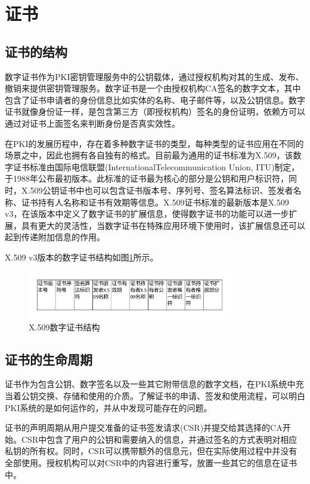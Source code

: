 \section{证书}

\subsection{证书的结构}

数字证书作为PKI密钥管理服务中的公钥载体，通过授权机构对其的生成、发布、撤销来提供密钥管理服务。数字证书是一个由授权机构CA签名的数字文本，其中包含了证书申请者的身份信息比如实体的名称、电子邮件等，以及公钥信息。数字证书就像身份证一样，是包含第三方（即授权机构）签名的身份证明，依赖方可以通过对证书上面签名来判断身份是否真实效性。

在PKI的发展历程中，存在着多种数字证书的类型，每种类型的证书应用在不同的场景之中，因此也拥有各自独有的格式。目前最为通用的证书标准为X.509，该数字证书标准由国际电信联盟(InternationalTelecommunication Union, ITU)制定，于1988年公布最初版本。此标准的证书最为核心的部分是公钥和用户标识符，同时，X.509公钥证书中也可以包含证书版本号、序列号、签名算法标识、签发者名称、证书持有人名称和证书有效期等信息。X.509证书标准的最新版本是X.509 v3，在该版本中定义了数字证书的扩展信息，使得数字证书的功能可以进一步扩展，具有更大的灵活性，当数字证书在特殊应用环境下使用时，该扩展信息还可以起到传递附加信息的作用。

X.509 v3版本的数字证书结构如图\ref{fig:cert}所示。

\begin{figure}[htbp]
 	\centering
 	\includegraphics[width = 0.8\textwidth]{img/cert}
 	\caption{X.509数字证书结构}\label{fig:cert}
\end{figure}




\subsection{证书的生命周期}


证书作为包含公钥、数字签名以及一些其它附带信息的数字文档，在PKI系统中充当着公钥交换、存储和使用的介质。了解证书的申请、签发和使用流程，可以明白PKI系统的是如何运作的，并从中发现可能存在的问题。

证书的声明周期从用户提交准备的证书签发请求(CSR)并提交给其选择的CA开始。CSR中包含了用户的公钥和需要纳入的信息，并通过签名的方式表明对相应私钥的所有权。同时，CSR可以携带额外的信息元，但在实际使用过程中并没有全部使用。授权机构可以对CSR中的内容进行重写，放置一些其它的信息在证书中。

